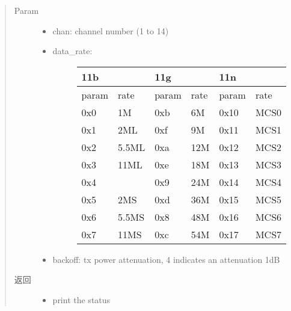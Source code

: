 \documentclass[letterpaper,10pt,english]{sphinxhowto}
\begin{document}
\begin{fulllineitems}
\begin{fulllineitems}
\begin{quote}
\begin{description}
\item[{Param}] \leavevmode\begin{itemize}
\item {} 
chan: channel number (1 to 14)

\item {} \begin{description}
\item[{data\_rate:}] \leavevmode

\begin{savenotes}\sphinxattablestart
\centering
\begin{tabulary}{\linewidth}[t]{|T|T|T|T|T|T|}
\hline
\sphinxstyletheadfamily 
11b
&\sphinxstyletheadfamily &\sphinxstyletheadfamily 
11g
&\sphinxstyletheadfamily &\sphinxstyletheadfamily 
11n
&\sphinxstyletheadfamily \\
\hline\sphinxstyletheadfamily 
param
&\sphinxstyletheadfamily 
rate
&\sphinxstyletheadfamily 
param
&\sphinxstyletheadfamily 
rate
&\sphinxstyletheadfamily 
param
&\sphinxstyletheadfamily 
rate
\\
\hline
0x0
&
1M
&
0xb
&
6M
&
0x10
&
MCS0
\\
\hline
0x1
&
2ML
&
0xf
&
9M
&
0x11
&
MCS1
\\
\hline
0x2
&
5.5ML
&
0xa
&
12M
&
0x12
&
MCS2
\\
\hline
0x3
&
11ML
&
0xe
&
18M
&
0x13
&
MCS3
\\
\hline
0x4
&
\textendash{}
&
0x9
&
24M
&
0x14
&
MCS4
\\
\hline
0x5
&
2MS
&
0xd
&
36M
&
0x15
&
MCS5
\\
\hline
0x6
&
5.5MS
&
0x8
&
48M
&
0x16
&
MCS6
\\
\hline
0x7
&
11MS
&
0xc
&
54M
&
0x17
&
MCS7
\\
\hline
\end{tabulary}
\par
\sphinxattableend\end{savenotes}

\end{description}

\item {} 
backoff: tx power attenuation, 4 indicates an attenuation 1dB

\end{itemize}

\item[{返回}] \leavevmode
\begin{itemize}
\item {} 
print the status

\end{itemize}



\end{description}
\end{quote}
\end{fulllineitems}
\end{fulllineitems}
\end{document}

